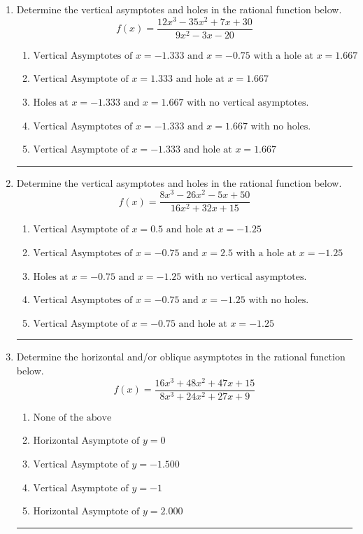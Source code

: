 \documentclass[14pt]{extbook}
\newcommand{\litem}[1]{\item#1\hspace*{-1cm}\rule{\textwidth}{0.4pt}}
\begin{document}
\begin{enumerate}
\litem{
Determine the vertical asymptotes and holes in the rational function below.\[ f(x) = \frac{12x^{3} -35 x^{2} +7 x + 30}{9x^{2} -3 x -20} \]\begin{enumerate}[label=\Alph*.]
\item \( \text{Vertical Asymptotes of } x = -1.333 \text{ and } x = -0.75 \text{ with a hole at } x = 1.667 \)
\item \( \text{Vertical Asymptote of } x = 1.333 \text{ and hole at } x = 1.667 \)
\item \( \text{Holes at } x = -1.333 \text{ and } x = 1.667 \text{ with no vertical asymptotes.} \)
\item \( \text{Vertical Asymptotes of } x = -1.333 \text{ and } x = 1.667 \text{ with no holes.} \)
\item \( \text{Vertical Asymptote of } x = -1.333 \text{ and hole at } x = 1.667 \)

\end{enumerate} }
\litem{
Determine the vertical asymptotes and holes in the rational function below.\[ f(x) = \frac{8x^{3} -26 x^{2} -5 x + 50}{16x^{2} +32 x + 15} \]\begin{enumerate}[label=\Alph*.]
\item \( \text{Vertical Asymptote of } x = 0.5 \text{ and hole at } x = -1.25 \)
\item \( \text{Vertical Asymptotes of } x = -0.75 \text{ and } x = 2.5 \text{ with a hole at } x = -1.25 \)
\item \( \text{Holes at } x = -0.75 \text{ and } x = -1.25 \text{ with no vertical asymptotes.} \)
\item \( \text{Vertical Asymptotes of } x = -0.75 \text{ and } x = -1.25 \text{ with no holes.} \)
\item \( \text{Vertical Asymptote of } x = -0.75 \text{ and hole at } x = -1.25 \)

\end{enumerate} }
\litem{
Determine the horizontal and/or oblique asymptotes in the rational function below.\[ f(x) = \frac{16x^{3} +48 x^{2} +47 x + 15}{8x^{3} +24 x^{2} +27 x + 9} \]\begin{enumerate}[label=\Alph*.]
\item \( \text{None of the above} \)
\item \( \text{Horizontal Asymptote of } y = 0  \)
\item \( \text{Vertical Asymptote of } y = -1.500  \)
\item \( \text{Vertical Asymptote of } y = -1  \)
\item \( \text{Horizontal Asymptote of } y = 2.000  \)


\end{enumerate}}
\end{enumerate}
\end{document}

